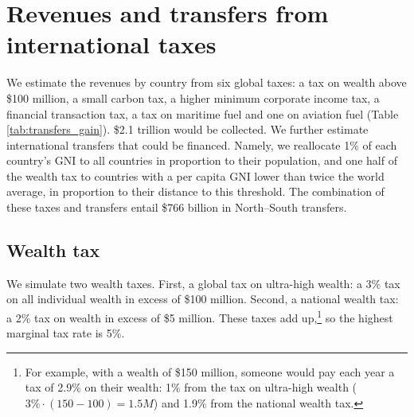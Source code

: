 \documentclass[12pt,english]{article}
\begin{document}
\section{Revenues and transfers from international taxes}\label{app:taxes}
  We estimate the revenues by country from six global taxes: a tax on wealth above \$100 million, a small carbon tax, a higher minimum corporate income tax, %
  a financial transaction tax, a tax on maritime fuel and one on aviation fuel (Table \ref{tab:transfers_gain}). \$2.1 trillion would be collected. %
  We further estimate international transfers that could be financed.  %
  Namely, we reallocate 1\% of each country's GNI to all countries in proportion to their %
  population, and one half of the wealth tax to countries with a per capita GNI lower than twice the world average, in proportion to their distance to this threshold. The combination of these taxes and transfers entail \$766 billion in North--South transfers.  


\subsection{Wealth tax}\label{sec:wealth}


We simulate two wealth taxes. First, a global tax on ultra-high wealth: a 3\% tax on all individual wealth in excess of \$100 million. Second, a national wealth tax: a 2\% tax on wealth in excess of \$5 million. These taxes add up,\footnote{For example, with a wealth of \$150 million, someone would pay each year a tax of 2.9\% on their wealth: 1\% from the tax on ultra-high wealth ($3\% \cdot \left(150-100\right)=1.5M$) and 1.9\% from the national wealth tax.%
} so the highest marginal tax rate is 5\%.
\end{document}
